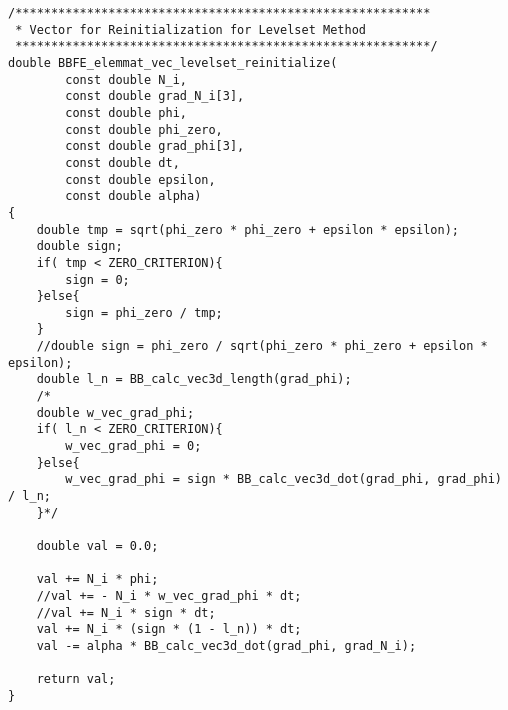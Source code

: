 \begin{lstlisting}[caption = mlflow\_elemmat.cにおける再初期化の右辺ベクトルの計算]
/**********************************************************
 * Vector for Reinitialization for Levelset Method 
 **********************************************************/
double BBFE_elemmat_vec_levelset_reinitialize(
		const double N_i,
		const double grad_N_i[3],
		const double phi,
		const double phi_zero,
		const double grad_phi[3],
		const double dt,
		const double epsilon,
		const double alpha)
{
	double tmp = sqrt(phi_zero * phi_zero + epsilon * epsilon);
	double sign;
	if( tmp < ZERO_CRITERION){
		sign = 0;
	}else{
		sign = phi_zero / tmp;
	}
	//double sign = phi_zero / sqrt(phi_zero * phi_zero + epsilon * epsilon);
	double l_n = BB_calc_vec3d_length(grad_phi);
	/*
	double w_vec_grad_phi;
	if( l_n < ZERO_CRITERION){
		w_vec_grad_phi = 0;
	}else{
		w_vec_grad_phi = sign * BB_calc_vec3d_dot(grad_phi, grad_phi) / l_n;
	}*/

	double val = 0.0;

	val += N_i * phi;
	//val += - N_i * w_vec_grad_phi * dt;
	//val += N_i * sign * dt;
	val += N_i * (sign * (1 - l_n)) * dt;
	val -= alpha * BB_calc_vec3d_dot(grad_phi, grad_N_i);

	return val;
}
\end{lstlisting}


